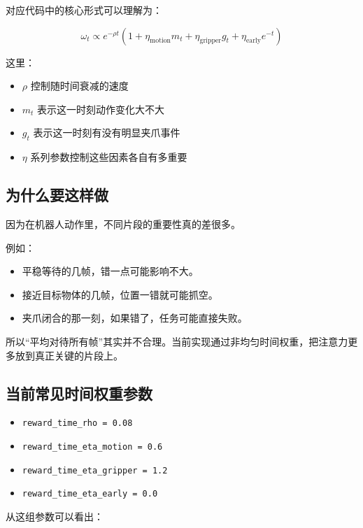 \documentclass[12pt]{ctexart}
\begin{document}
对应代码中的核心形式可以理解为：

\begin{equation}
    \omega_t \propto
    e^{-\rho t}
    \left(
    1 + \eta_{\text{motion}} m_t + \eta_{\text{gripper}} g_t + \eta_{\text{early}} e^{-t}
    \right)
\end{equation}

这里：

\begin{itemize}
    \item $\rho$ 控制随时间衰减的速度
    \item $m_t$ 表示这一时刻动作变化大不大
    \item $g_t$ 表示这一时刻有没有明显夹爪事件
    \item $\eta$ 系列参数控制这些因素各自有多重要
\end{itemize}

\subsection{为什么要这样做}

因为在机器人动作里，不同片段的重要性真的差很多。

例如：

\begin{itemize}
    \item 平稳等待的几帧，错一点可能影响不大。
    \item 接近目标物体的几帧，位置一错就可能抓空。
    \item 夹爪闭合的那一刻，如果错了，任务可能直接失败。
\end{itemize}

所以“平均对待所有帧”其实并不合理。当前实现通过非均匀时间权重，把注意力更多放到真正关键的片段上。

\subsection{当前常见时间权重参数}

\begin{itemize}
    \item \texttt{reward\_time\_rho = 0.08}
    \item \texttt{reward\_time\_eta\_motion = 0.6}
    \item \texttt{reward\_time\_eta\_gripper = 1.2}
    \item \texttt{reward\_time\_eta\_early = 0.0}
\end{itemize}

从这组参数可以看出：
\end{document}
